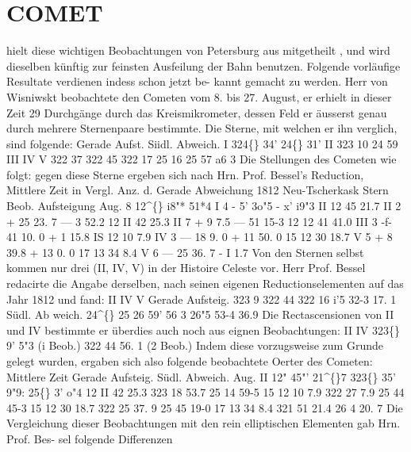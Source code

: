 \documentclass[12pt,a4paper]{article}
\newcommand{\degree}{\textdegree}
\begin{document}
\section*{COMET}
hielt  diese  wichtigen  Beobachtungen  von  Petersburg  aus  mitgetheilt ,  und  wird  dieselben  künftig  zur 
feinsten  Ausfeilung  der  Bahn  benutzen.  Folgende  vorläufige  Resultate  verdienen  indess  schon  jetzt  be- 
kannt gemacht  zu  werden. 
Herr  von  Wisniwskt  beobachtete  den  Cometen  vom  8.  bis  27.  August,  er  erhielt  in  dieser  Zeit 
29  Durchgänge  durch  das  Kreismikrometer,  dessen  Feld  er  äusserst  genau  durch  mehrere  Sternenpaare 
bestimmte.     Die  Sterne,  mit  welchen  er  ihn  verglich,  sind  folgende: 
Gerade  Aufst. 
Siidl.  Abweich. 
I 
324\degree\{\}  34' 
24\degree\{\}  31' 
II 
323     10 
24     59 
III 
IV 
V 
322    37 
322     45 
322     17 
25     16 
25     57 
a6       3 
Die  Stellungen  des  Cometen 
wie  folgt: 
gegen  diese  Sterne  ergeben  sich  nach  Hrn.  Prof.  Bessel's  Reduction, 
Mittlere  Zeit  in Vergl. Anz.  d. 
Gerade 
Abweichung 
1812 
Neu-Tscherkask 
Stern 
Beob. 
Aufsteigung 
Aug.    8 
12\textasciicircum\{\}  i8"*  51*4 
I 
4 
-    5'    3o"5 
-    x'    i9"3 
II 
12    45     21.7 
II 
2 
+  25     23.  7 
---    3     52.2 
12 
II     42     25.3 
II 
7 
+    9       7.5 
---  51     15-3 
12 
12      41       41.0 
III 
3 
-f-  41     10. 0 
+    1     15.8 
IS 
12       10         7.9 
IV 
3 
---  18      9.  0 
+  11     50. 0 
15 
12       30       18.7 
V 
5 
+    8     39.8 
+  13       0. 0 
17 
13     34       8.4 
V 
6 
---  25     36.  7 
-    I       1.7 
Von  den  Sternen  selbst  kommen  nur  drei  (II,  IV,  V)  in  der  Histoire  Celeste  vor.     Herr  Prof.  Bessel 
redacirte  die  Angabe  derselben,  nach  seinen  eigenen  Reductionselementen  auf  das  Jahr  1812  und  fand: 
II 
IV 
V 
Gerade  Aufsteig. 
323  9 
322  44 
322     16 
i'5 
32-3 
17. 1 
Südl.  Ab  weich. 
24\textasciicircum\{\} 
25 
26 
59' 
56 
3 
26"5 
53-4 
36.9 
Die  Rectascensionen  von  II  und  IV  bestimmte  er  überdies  auch  noch  aus  eignen  Beobachtungen: 
II 
IV 
323\degree\{\}     9'     5"3     (i  Beob.) 
322    44    56. 1     (2  Beob.) 
Indem  diese  vorzugsweise  zum  Grunde  gelegt  wurden,   ergaben  sich    also  folgende    beobachtete 
Oerter  des  Cometen: 
Mittlere  Zeit 
Gerade  Aufsteig. 
Südl.  Abweich. 
Aug.  II 
12"  45"'  21\textasciicircum\{\}7 
323\degree\{\}  35'      9"9: 
25\degree\{\}     3'      o"4 
12 
II    42    25.3 
323     18     53.7 
25     14     59-5 
15 
12    10      7.9 
322     27      7.9 
25     44     45-3 
15 
12    30    18.7 
322     25     37. 9 
25     45     19-0 
17 
13     34       8.4 
321     51     21.4 
26       4     20. 7 
Die  Vergleichung  dieser  Beobachtungen  mit  den  rein  elliptischen  Elementen  gab  Hrn.  Prof.  Bes- 
sel folgende  Differenzen 
\end{document}
